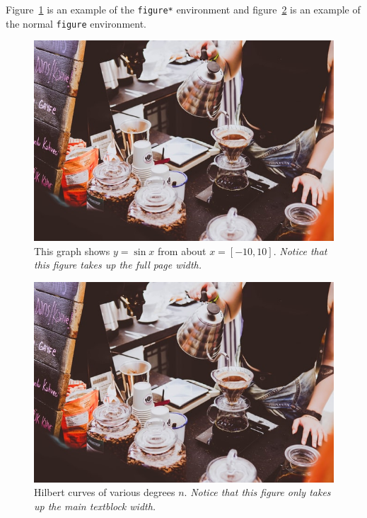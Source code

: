 \documentclass{tufte-handout}
\begin{document}
Figure~\ref{fig:fullfig} is an example of the \Verb|figure*|
environment and figure~\ref{fig:textfig} is an example of the normal
\Verb|figure| environment.

\begin{figure}[h]
  \includegraphics[width=\linewidth]{sample}%
  \caption{This graph shows $y = \sin x$ from about $x = [-10, 10]$.
  \emph{Notice that this figure takes up the full page width.}}%
  \label{fig:fullfig}%
\end{figure}

\begin{figure}
  \includegraphics{sample}
  \caption{Hilbert curves of various degrees $n$.
  \emph{Notice that this figure only takes up the main textblock width.}}
  \label{fig:textfig}
\end{figure}
\end{document}
